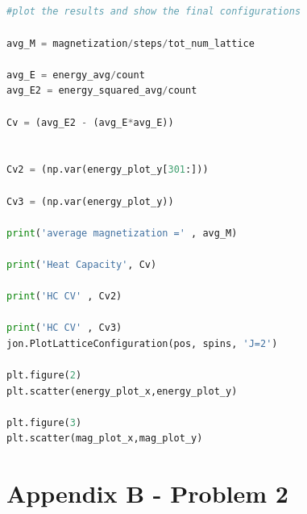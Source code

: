 \documentclass{article}
\begin{document}
\begin{lstlisting}[language=Python]
    
        
        
        
#plot the results and show the final configurations
   
avg_M = magnetization/steps/tot_num_lattice   

avg_E = energy_avg/count
avg_E2 = energy_squared_avg/count

Cv = (avg_E2 - (avg_E*avg_E))


Cv2 = (np.var(energy_plot_y[301:]))

Cv3 = (np.var(energy_plot_y))

print('average magnetization =' , avg_M)

print('Heat Capacity', Cv)

print('HC CV' , Cv2)
    
print('HC CV' , Cv3)
jon.PlotLatticeConfiguration(pos, spins, 'J=2')   

plt.figure(2)
plt.scatter(energy_plot_x,energy_plot_y) 

plt.figure(3)
plt.scatter(mag_plot_x,mag_plot_y) 

\end{lstlisting}

\newpage

\section*{Appendix B - Problem 2}
\end{document}
